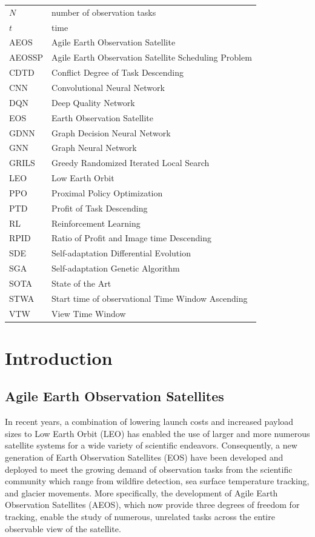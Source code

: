 \documentclass[conf]{new-aiaa}
\begin{document}
{\renewcommand\arraystretch{1.0}
\noindent\begin{longtable*}{@{}l @{\quad=\quad} l@{}}
$N$  & number of observation tasks \\
$t$  & time \\
AEOS   & Agile Earth Observation Satellite \\
AEOSSP & Agile Earth Observation Satellite Scheduling Problem \\
CDTD   & Conflict Degree of Task Descending \\
CNN    & Convolutional Neural Network \\
DQN    & Deep Quality Network \\
EOS    & Earth Observation Satellite \\
GDNN   & Graph Decision Neural Network \\
GNN    & Graph Neural Network \\
GRILS  & Greedy Randomized Iterated Local Search \\
LEO    & Low Earth Orbit \\
PPO    & Proximal Policy Optimization \\
PTD    & Profit of Task Descending \\
RL     & Reinforcement Learning \\
RPID   & Ratio of Profit and Image time Descending \\
SDE    & Self-adaptation Differential Evolution \\
SGA    & Self-adaptation Genetic Algorithm \\
SOTA   & State of the Art \\
STWA   & Start time of observational Time Window Ascending \\
VTW    & View Time Window \\
\end{longtable*}}

\section{Introduction}

\subsection{Agile Earth Observation Satellites}
In recent years, a combination of lowering launch costs and increased payload sizes to Low Earth Orbit (LEO) has enabled the use of larger and more numerous satellite systems for a wide variety of scientific endeavors.
Consequently, a new generation of Earth Observation Satellites (EOS) have been developed and deployed to meet the growing demand of observation tasks from the scientific community which range from wildfire detection\cite{shams2025assessing}, sea surface temperature tracking\cite{minnett2019half}, and glacier movements\cite{raup2015remote}.
More specifically, the development of Agile Earth Observation Satellites (AEOS), which now provide three degrees of freedom for tracking, enable the study of numerous, unrelated tasks across the entire observable view of the satellite.
\end{document}
